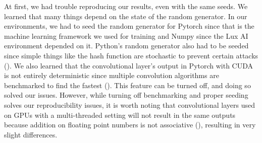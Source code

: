 \bigskip

\noindent At first, we had trouble reproducing our results, even with the same seeds. We learned that many things depend on the state of the random generator. In our environments, we had to seed the random generator for Pytorch since that is the machine learning framework we used for training and Numpy since the Lux AI environment depended on it. Python's random generator also had to be seeded since simple things like the hash function are stochastic to prevent certain attacks (\cite{stackoverflow_answer_27522708}). We also learned that the convolutional layer's output in Pytorch with CUDA is not entirely deterministic since multiple convolution algorithms are benchmarked to find the fastest (\cite{pytorch_randomness}). This feature can be turned off, and doing so solved our issues. However, while turning off benchmarking and proper seeding solves our reproducibility issues, it is worth noting that convolutional layers used on GPUs with a multi-threaded setting will not result in the same outputs because addition on floating point numbers is not associative (\cite{oracle_goldberg}), resulting in very slight differences.

\bigskip

